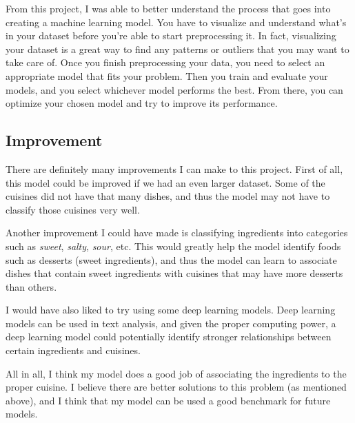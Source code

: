 \documentclass[12pt]{article}
\begin{document}
From this project, I was able to better understand the process that goes into creating a machine learning model. You have to visualize and understand what's in your dataset before you're able to start preprocessing it. In fact, visualizing your dataset is a great way to find any patterns or outliers that you may want to take care of. Once you finish preprocessing your data, you need to select an appropriate model that fits your problem. Then you train and evaluate your models, and you select whichever model performs the best. From there, you can optimize your chosen model and try to improve its performance.

\subsection{Improvement}

There are definitely many improvements I can make to this project. First of all, this model could be improved if we had an even larger dataset. Some of the cuisines did not have that many dishes, and thus the model may not have to classify those cuisines very well.

Another improvement I could have made is classifying ingredients into categories such as \textit{sweet}, \textit{salty}, \textit{sour}, etc. This would greatly help the model identify foods such as desserts (sweet ingredients), and thus the model can learn to associate dishes that contain sweet ingredients with cuisines that may have more desserts than others.

I would have also liked to try using some deep learning models. Deep learning models can be used in text analysis, and given the proper computing power, a deep learning model could potentially identify stronger relationships between certain ingredients and cuisines.

All in all, I think my model does a good job of associating the ingredients to the proper cuisine. I believe there are better solutions to this problem (as mentioned above), and I think that my model can be used a good benchmark for future models.
\end{document}
